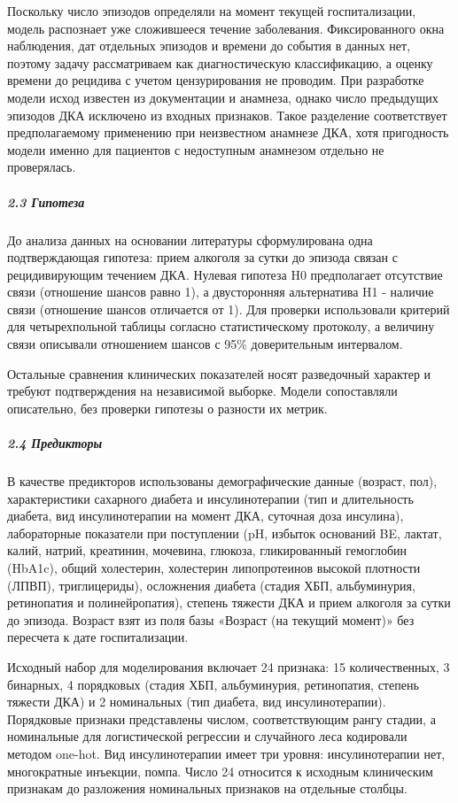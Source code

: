 \documentclass{crm-article}
\begin{document}
Поскольку число эпизодов определяли на момент текущей госпитализации, модель распознает уже сложившееся течение заболевания. Фиксированного окна наблюдения, дат отдельных эпизодов и времени до события в данных нет, поэтому задачу рассматриваем как диагностическую классификацию, а оценку времени до рецидива с учетом цензурирования не проводим. При разработке модели исход известен из документации и анамнеза, однако число предыдущих эпизодов ДКА исключено из входных признаков. Такое разделение соответствует предполагаемому применению при неизвестном анамнезе ДКА, хотя пригодность модели именно для пациентов с недоступным анамнезом отдельно не проверялась.

\subparagraph{2.3 Гипотеза}\label{subsec2_3}

До анализа данных на основании литературы сформулирована одна подтверждающая гипотеза: прием алкоголя за сутки до эпизода связан с рецидивирующим течением ДКА. Нулевая гипотеза H0 предполагает отсутствие связи (отношение шансов равно 1), а двусторонняя альтернатива H1 - наличие связи (отношение шансов отличается от 1). Для проверки использовали критерий для четырехпольной таблицы согласно статистическому протоколу, а величину связи описывали отношением шансов с 95\% доверительным интервалом.

Остальные сравнения клинических показателей носят разведочный характер и требуют подтверждения на независимой выборке. Модели сопоставляли описательно, без проверки гипотезы о разности их метрик.

\subparagraph{2.4 Предикторы}\label{subsec2_4}

В качестве предикторов использованы демографические данные (возраст, пол), характеристики сахарного диабета и инсулинотерапии (тип и длительность диабета, вид инсулинотерапии на момент ДКА, суточная доза инсулина), лабораторные показатели при поступлении (pH, избыток оснований BE, лактат, калий, натрий, креатинин, мочевина, глюкоза, гликированный гемоглобин (HbA1c), общий холестерин, холестерин липопротеинов высокой плотности (ЛПВП), триглицериды), осложнения диабета (стадия ХБП, альбуминурия, ретинопатия и полинейропатия), степень тяжести ДКА и прием алкоголя за сутки до эпизода. Возраст взят из поля базы «Возраст (на текущий момент)» без пересчета к дате госпитализации.

Исходный набор для моделирования включает 24 признака: 15 количественных, 3 бинарных, 4 порядковых (стадия ХБП, альбуминурия, ретинопатия, степень тяжести ДКА) и 2 номинальных (тип диабета, вид инсулинотерапии). Порядковые признаки представлены числом, соответствующим рангу стадии, а номинальные для логистической регрессии и случайного леса кодировали методом one-hot. Вид инсулинотерапии имеет три уровня: инсулинотерапии нет, многократные инъекции, помпа. Число 24 относится к исходным клиническим признакам до разложения номинальных признаков на отдельные столбцы.
\end{document}
